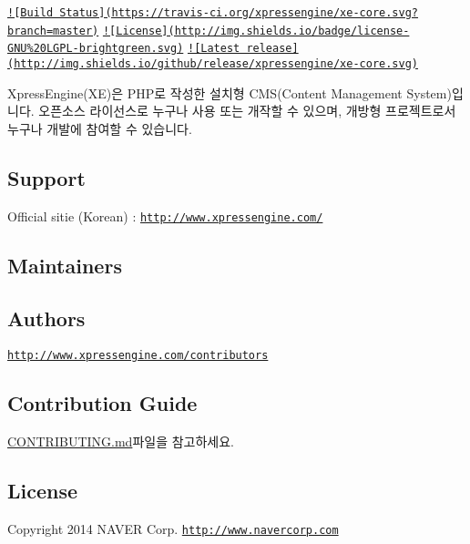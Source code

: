 \href{https://travis-ci.org/xpressengine/xe-core}{\tt !\mbox{[}Build Status\mbox{]}(https\+://travis-\/ci.\+org/xpressengine/xe-\/core.\+svg?branch=master)} \href{http://www.gnu.org/licenses/gpl.html}{\tt !\mbox{[}License\mbox{]}(http\+://img.\+shields.\+io/badge/license-\/\+G\+N\+U\%20\+L\+G\+P\+L-\/brightgreen.\+svg)} \href{https://github.com/xpressengine/xe-core/releases}{\tt !\mbox{[}Latest release\mbox{]}(http\+://img.\+shields.\+io/github/release/xpressengine/xe-\/core.\+svg)}

Xpress\+Engine(\+X\+E)은 P\+H\+P로 작성한 설치형 C\+M\+S(\+Content Management System)입니다. 오픈소스 라이선스로 누구나 사용 또는 개작할 수 있으며, 개방형 프로젝트로서 누구나 개발에 참여할 수 있습니다.

\subsection*{Support}


\begin{DoxyItemize}
\item Official sitie (Korean) \+: \href{http://www.xpressengine.com/}{\tt http\+://www.\+xpressengine.\+com/}
\end{DoxyItemize}

\subsection*{Maintainers}

\subsection*{Authors}

\href{http://www.xpressengine.com/contributors}{\tt http\+://www.\+xpressengine.\+com/contributors}

\subsection*{Contribution Guide}

{\ttfamily \hyperlink{CONTRIBUTING_8md}{C\+O\+N\+T\+R\+I\+B\+U\+T\+I\+N\+G.\+md}}파일을 참고하세요.

\subsection*{License}

Copyright 2014 N\+A\+V\+E\+R Corp. \href{http://www.navercorp.com}{\tt http\+://www.\+navercorp.\+com}

